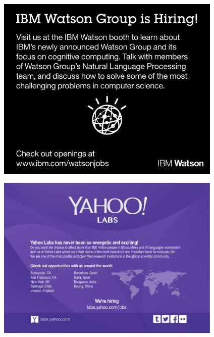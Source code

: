\newpage
\thispagestyle{empty}

\includegraphics[width=4.25in]{content/ads/gold/Watson.pdf}

\vfill

\includegraphics[width=4.25in]{content/ads/gold/Yahoo-Ad.pdf}
